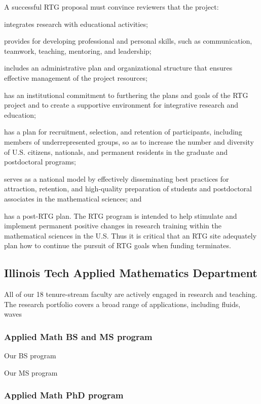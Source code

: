 \documentclass[11pt]{article}
\begin{document}
A successful RTG proposal must convince reviewers that the project:

integrates research with educational activities;

provides for developing professional and personal skills, such as communication, teamwork, teaching, mentoring, and leadership;

includes an administrative plan and organizational structure that ensures effective management of the project resources;

has an institutional commitment to furthering the plans and goals of the RTG project and to create a supportive environment for integrative research and education;

has a plan for recruitment, selection, and retention of participants, including members of underrepresented groups, so as to increase the number and diversity of U.S. citizens, nationals, and permanent residents in the graduate and postdoctoral programs;

serves as a national model by effectively disseminating best practices for attraction, retention, and high-quality preparation of students and postdoctoral associates in the mathematical sciences; and

has a post-RTG plan. The RTG program is intended to help stimulate and implement permanent positive changes in research training within the mathematical sciences in the U.S. Thus it is critical that an RTG site adequately plan how to continue the pursuit of RTG goals when funding terminates.



\subsection{Illinois Tech Applied Mathematics Department}

All of our 18 tenure-stream faculty are actively engaged in research and teaching. The research portfolio covers a broad range of applications, including fluids, waves


\subsubsection{Applied Math BS and MS program}

Our BS program

Our MS program

\subsubsection{Applied Math PhD program}
\end{document}
